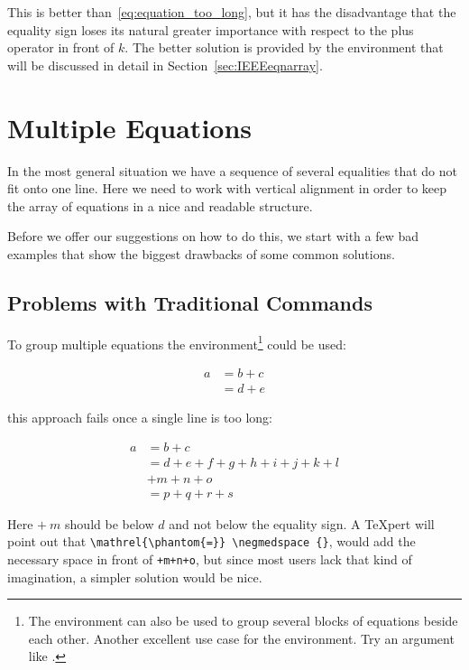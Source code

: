 This is better than~\eqref{eq:equation_too_long}, but
it has the disadvantage that the equality sign loses its natural
greater importance with respect to the plus operator in front of
$k$. The better solution is provided by the
 environment that will be discussed in detail in
Section~\ref{sec:IEEEeqnarray}.

\section{Multiple Equations}%
\label{sec:IEEEeqnarray}

In the most general situation we have a sequence of several
equalities that do not fit onto one line. Here we need to work with
vertical alignment in order to keep the array of equations in a nice
and readable structure.

Before we offer our suggestions on how to do this, we start with a few
bad examples that show the biggest drawbacks of some common solutions.


\subsection{Problems with Traditional Commands}%
\label{sec:problems_traditional}

To group multiple equations the
 environment\footnote{The  environment can
  also be used to group several blocks of equations beside each other.
  Another excellent use case for the
   environment. Try an argument like
  .} could be used:
\begin{example}
\begin{align}
  a & = b + c \\
  & = d + e
\end{align}
\end{example}

this approach fails once a single line is too long:
\begin{example}
\begin{align}
  a & = b + c \\
  & = d + e + f + g + h + i 
  + j + k + l \nonumber \\
  & + m + n + o \\
  & = p + q + r + s
\end{align}
\end{example}
\noindent
Here $+\:m$ should be below $d$ and not below the equality sign. A
\TeX{}pert will point out that \verb+\mathrel{\phantom{=}} \negmedspace {}+,
would add the necessary space in front of \verb|+m+n+o|, but since most users
lack that kind of imagination, a simpler solution would be nice.

